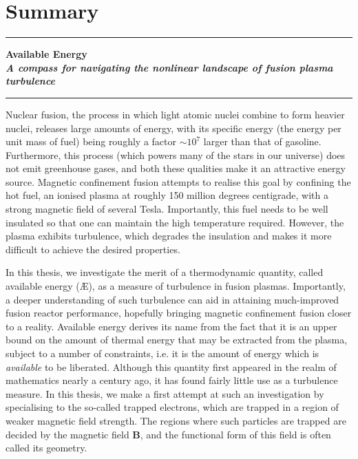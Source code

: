 \chapter*{Summary} %


\begin{center}
\rule{\textwidth}{.75pt}\vspace*{1mm}
\textbf{{\Large Available Energy\\[2mm] \textit{A compass for navigating the nonlinear landscape of fusion plasma turbulence}}}
\rule{\textwidth}{.75pt}
\end{center}
\vspace*{2ex}
Nuclear fusion, the process in which light atomic nuclei combine to form heavier nuclei, releases large amounts of energy, with its specific energy (the energy per unit mass of fuel) being roughly a factor $\sim 10^7$ larger than that of gasoline. Furthermore, this process (which powers many of the stars in our universe) does not emit greenhouse gases, and both these qualities make it an attractive energy source. Magnetic confinement fusion attempts to realise this goal by confining the hot fuel, an ionised plasma at roughly 150 million degrees centigrade, with a strong magnetic field of several Tesla. Importantly, this fuel needs to be well insulated so that one can maintain the high temperature required. However, the plasma exhibits turbulence, which degrades the insulation and makes it more difficult to achieve the desired properties. \par
In this thesis, we investigate the merit of a thermodynamic quantity, called available energy (\AE{}), as a measure of turbulence in fusion plasmas. Importantly, a deeper understanding of such turbulence can aid in attaining much-improved fusion reactor performance, hopefully bringing magnetic confinement fusion closer to a reality. Available energy derives its name from the fact that it is an upper bound on the amount of thermal energy that may be extracted from the plasma, subject to a number of constraints, i.e. it is the amount of energy which is {\it available} to be liberated. Although this quantity first appeared in the realm of mathematics nearly a century ago, it has found fairly little use as a turbulence measure. In this thesis, we make a first attempt at such an investigation by specialising to the so-called trapped electrons, which are trapped in a region of weaker magnetic field strength. The regions where such particles are trapped are decided by the magnetic field $\boldsymbol{B}$, and the functional form of this field is often called its geometry. \par 
